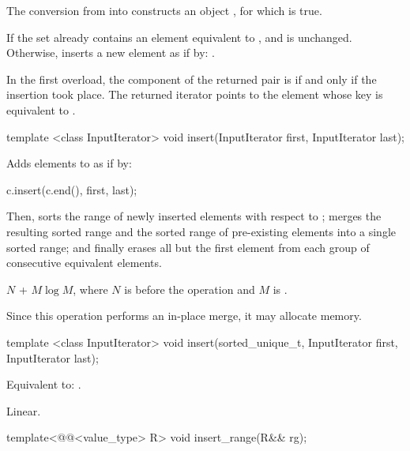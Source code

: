 \begin{addedblock}
\begin{itemdescr}
\pnum
\expects The conversion from  into  constructs an
object , for which  is true.

\pnum
\effects
If the set already contains an element equivalent to , 
and  is unchanged.  Otherwise, inserts a new element as if
by: .

\pnum
\returns
In the first overload, the  component of the returned pair
is  if and only if the insertion took place.  The returned
iterator points to the element whose key is equivalent to .
\end{itemdescr}

%
\begin{itemdecl}
template <class InputIterator>
  void insert(InputIterator first, InputIterator last);
\end{itemdecl}

\begin{itemdescr}
\pnum
\effects Adds elements to  as if by:
\begin{codeblock}
c.insert(c.end(), first, last);
\end{codeblock}
Then, sorts the range of newly inserted elements with respect
to ; merges the resulting sorted range and the sorted
range of pre-existing elements into a single sorted range; and finally
erases all but the first element from each group of consecutive equivalent
elements.

\pnum
\complexity
$N$ + $M \log M$, where $N$ is  before the operation and $M$
is .

\pnum
\remarks
Since this operation performs an in-place merge, it may allocate memory.
\end{itemdescr}

%
\begin{itemdecl}
template <class InputIterator>
  void insert(sorted_unique_t, InputIterator first, InputIterator last);
\end{itemdecl}

\begin{itemdescr}
\pnum \effects Equivalent to: .

\pnum \complexity Linear.
\end{itemdescr}

%
\begin{itemdecl}
template<@@<value_type> R>
  void insert_range(R&& rg);
\end{itemdecl}


\end{addedblock}
